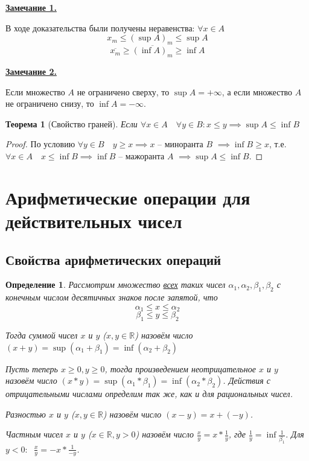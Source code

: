 \documentclass[a4paper,oneside]{article}
\newcommand{\parspace}{\vspace{10pt}}
\newtheorem{theorem}{Теорема}[subsection]
\newtheorem{definition}{Определение}[subsection]
\begin{document}
\underline{\textbf{Замечание 1.}}

В ходе доказательства были получены неравенства: $\forall x \in A$
\[x_m \le (\sup A)_m \le \sup A\]
\[\overline{x_m} \ge \overline{(\inf A)_m} \ge \inf A\]

\parspace

\underline{\textbf{Замечание 2.}}

Если множество $A$ не ограничено сверху, то $\sup A = + \infty$, а если множество $A$
не ограничено снизу, то $\inf A = - \infty$.

\parspace

\begin{theorem}[Свойство граней]
    Если $\forall x \in A \quad \forall y \in B: x \le y \implies \sup A \le \inf B$
\end{theorem}

\begin{proof}
    По условию $\forall y \in B \quad y \ge x \implies x$ -- миноранта $B$
    $\implies \inf B \ge x$, т.е. $\forall x \in A \quad x \le \inf B \implies \inf B$ --
    мажоранта $A$ $\implies \sup A \le \inf B$.
\end{proof}

\section{Арифметические операции для действительных чисел}

\subsection{Свойства арифметических операций}

\begin{definition}
    Рассмотрим множество \underline{всех} таких чисел
    $\alpha_1, \alpha_2, \beta_1, \beta_2$ с конечным числом десятичных знаков
    после запятой, что
    \[\alpha_1 \le x \le \alpha_2\]
    \[\beta_1 \le y \le \beta_2\]

    Тогда суммой чисел $x$ и $y$ ($x, y \in \mathbb{R}$) назовём число 
    $(x + y) = \sup (\alpha_1 + \beta_1) = \inf (\alpha_2 + \beta_2)$

    Пусть теперь $x \ge 0, y \ge 0$, тогда произведением неотрицательное $x$ и $y$
    назовём число $(x * y) = \sup (\alpha_1 * \beta_1) = \inf (\alpha_2 * \beta_2)$.
    Действия с отрицательными числами определим так же, как и для рациональных чисел.

    Разностью $x$ и $y$ ($x, y \in \mathbb{R}$) назовём число $(x - y) = x + (-y)$.

    Частным чисел $x$ и $y$ ($x \in \mathbb{R}, y > 0$) назовём число 
    $\frac{x}{y} = x * \frac{1}{y}$, где $\frac{1}{y} = \inf \frac{1}{\beta_1}$.
    Для $y < 0: \:$ $\frac{x}{y} = -x * \frac{1}{-y}$.
\end{definition}
\end{document}
